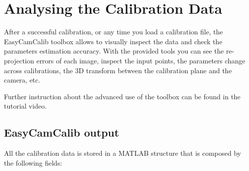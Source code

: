 \documentclass[article,11pt]{memoir}
\begin{document}
\chapter{Analysing the Calibration Data}

After a successful calibration, or any time you load a calibration file, the EasyCamCalib toolbox allows to visually inspect the data and check the parameters estimation accuracy. With the provided tools you can see the re-projection errors of each image, inspect the input points, the parameters change across calibrations, the 3D transform between the calibration plane and the camera, etc. 

Further instruction about the advanced use of the toolbox can be found in the tutorial video.

\section{EasyCamCalib output}
\label{sec:calibparams}
All the calibration data is stored in a MATLAB structure that is composed by the following fields:
\end{document}
